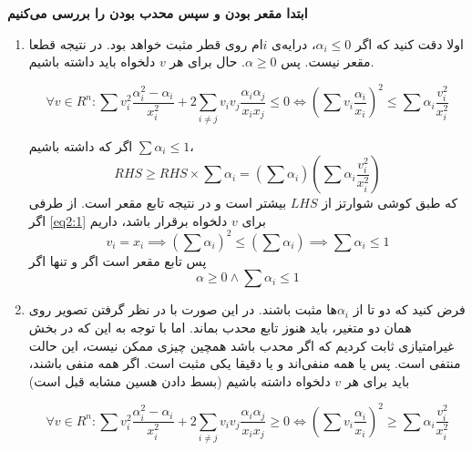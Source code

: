 \textbf{ابتدا مقعر بودن و سپس محدب بودن را بررسی می‌کنیم}
\begin{enumerate}
	\item 
اولا دقت کنید که اگر 
$\alpha_i \le 0$،
درایه‌ی $i$‌ام روی قطر مثبت خواهد بود. در نتیجه قطعا مقعر نیست. پس
$\alpha \ge 0$.
حال برای هر $v$ دلخواه باید داشته باشیم.

\begin{equation}
\forall v \in R^n : \sum v_i^2\frac{\alpha_i^2 - \alpha_i}{x_i^2} + 2\sum_{i \ne j} v_iv_j\frac{\alpha_i\alpha_j}{x_ix_j} \le 0 \iff 
(\sum v_i\frac{\alpha_i}{x_i})^2 \le \sum \alpha_i\frac{v_i^2}{x_i^2}
\label{eq2:1}
\end{equation}

اگر که داشته باشیم
$\sum \alpha_i \le 1$،
\[
RHS \ge RHS \times \sum \alpha_i = (\sum \alpha_i)(\sum \alpha_i\frac{v_i^2}{x_i^2})
\]
که طبق کوشی شوارتز از
$LHS$
بیشتر است و در نتیجه تابع مقعر است. از طرفی اگر 
\ref{eq2:1}
برای $v$ دلخواه برقرار باشد، داریم
\[
v_i = x_i \implies (\sum \alpha_i)^2 \le (\sum \alpha_i) \implies \sum \alpha_i \le 1
\]
پس تابع مقعر است اگر و تنها اگر
\[
\alpha \ge 0 \land \sum \alpha_i \le 1
\]
\item 
فرض کنید که دو تا از
$\alpha_i$‌ها
مثبت باشند. در این صورت با در نظر گرفتن تصویر روی همان دو متغیر، باید هنوز تابع محدب بماند. اما با توجه به این که در بخش غیرامتیازی ثابت کردیم که اگر محدب باشد همچین چیزی ممکن نیست، این حالت منتفی است. پس یا همه منفی‌اند و یا دقیقا یکی مثبت است. اگر همه منفی باشند، باید برای هر $v$ دلخواه داشته باشیم (بسط دادن هسین مشابه قبل است)

\begin{equation}
\forall v \in R^n : \sum v_i^2\frac{\alpha_i^2 - \alpha_i}{x_i^2} + 2\sum_{i \ne j} v_iv_j\frac{\alpha_i\alpha_j}{x_ix_j} \ge 0 \iff 
(\sum v_i\frac{\alpha_i}{x_i})^2 \ge \sum \alpha_i\frac{v_i^2}{x_i^2}
\label{eq2:2}
\end{equation}


\end{enumerate}

